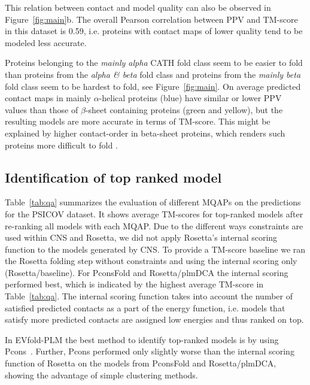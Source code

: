 \documentclass{bioinfo}
\begin{document}
This relation between contact and model quality can also be observed
in Figure~\ref{fig:main}b. The overall Pearson correlation between PPV and TM-score in
this dataset is 0.59, i.e. proteins with contact maps of lower quality tend
to be modeled less accurate. 


Proteins belonging to the {\it mainly alpha} CATH fold class seem to
be easier to fold than proteins from the {\it alpha \& beta} fold
class and proteins from the {\it mainly beta} fold class seem to be
hardest to fold, see Figure~\ref{fig:main}. On average predicted contact maps in
mainly $\alpha$-helical proteins (blue) have similar or lower PPV
values than those of $\beta$-sheet containing proteins (green and
yellow), but the resulting models are more accurate in terms of
TM-score. {\color{red}This might be explained by higher
contact-order \cite[]{Plaxco1998985} in beta-sheet proteins, which
renders such proteins more difficult to fold
\cite[]{bradley_improved_2006}.}




\subsection{Identification of top ranked model}

Table~\ref{tab:qa} summarizes the evaluation of different MQAPs on the
predictions for the PSICOV dataset. It shows average TM-scores for
top-ranked models after re-ranking all models with each MQAP.
{\color{red}Due to the different ways constraints are used within CNS
and Rosetta, we did not apply Rosetta's internal scoring function to
the models generated by CNS.} {\color{red}To provide a TM-score
baseline we ran the Rosetta folding step without constraints and
using the internal scoring only (Rosetta/baseline).} {\color{red}For
PconsFold and Rosetta/plmDCA the internal scoring performed best,
which is indicated by the highest average TM-score in
Table~\ref{tab:qa}.} The internal scoring function takes into account
the number of satisfied predicted contacts as a part of the energy
function, i.e. models that satisfy more predicted contacts are
assigned low energies and thus ranked on top.

In  EVfold-PLM the best method to identify top-ranked models is by
using Pcons~\cite[]{lundstrom_pcons:_2001}.
Further, Pcons performed only slightly worse than the internal scoring
function of Rosetta on the models from PconsFold and
Rosetta/plmDCA, showing the advantage of simple clustering methods.
\end{document}
